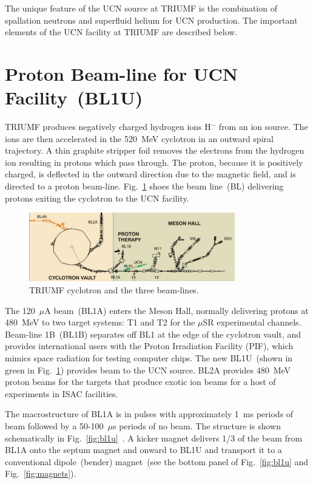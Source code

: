 The unique feature of the UCN source at TRIUMF is the combination of
spallation neutrons and superfluid helium for UCN production. The
important elements of the UCN facility at TRIUMF are described below.


\section{Proton Beam-line for UCN Facility~(BL1U)}
TRIUMF produces negatively charged hydrogen ions H$^-$ from an ion
source. The ions are then accelerated in the 520~MeV cyclotron in an
outward spiral trajectory. A thin graphite stripper foil removes the
electrons from the hydrogen ion resulting in protons which pass
through. The proton, because it is positively charged, is deflected in
the outward direction due to the magnetic field, and is directed to a
proton beam-line.
Fig.~\ref{fig:cyclotron} shoes the beam line~(BL) delivering protons
exiting the cyclotron to the UCN facility.

\begin{figure}[h!]
  \centering
  \includegraphics[width=0.8\textwidth]{cyclotron.png}
  \caption{TRIUMF cyclotron and the three beam-lines.}
  \label{fig:cyclotron}
\end{figure}


The 120~$\mu$A beam~(BL1A) enters the Meson Hall, normally delivering
protons at 480~MeV to two target systems: T1 and T2 for the $\mu$SR
experimental channels. Beam-line 1B~(BL1B) separates off BL1 at the
edge of the cyclotron vault, and provides international users with the
Proton Irradiation Facility (PIF), which mimics space radiation for
testing computer chips. The new BL1U~(shown in green in
Fig.~\ref{fig:cyclotron}) provides beam to the UCN source. BL2A
provides 480~MeV proton beams for the targets that produce exotic ion
beams for a host of experiments in ISAC facilities.


The macrostructure of BL1A is in pulses with approximately 1~ms
periods of beam followed by a 50-100~$\mu$s periods of no beam. The
structure is shown schematically in
Fig.~\ref{fig:bl1u}~\cite{Nick_thesis}. A kicker magnet delivers 1/3
of the beam from BL1A onto the septum magnet and onward to BL1U and
transport it to a conventional dipole~(bender) magnet~(see the bottom
panel of Fig.~\ref{fig:bl1u} and Fig.~\ref{fig:magnets}).

